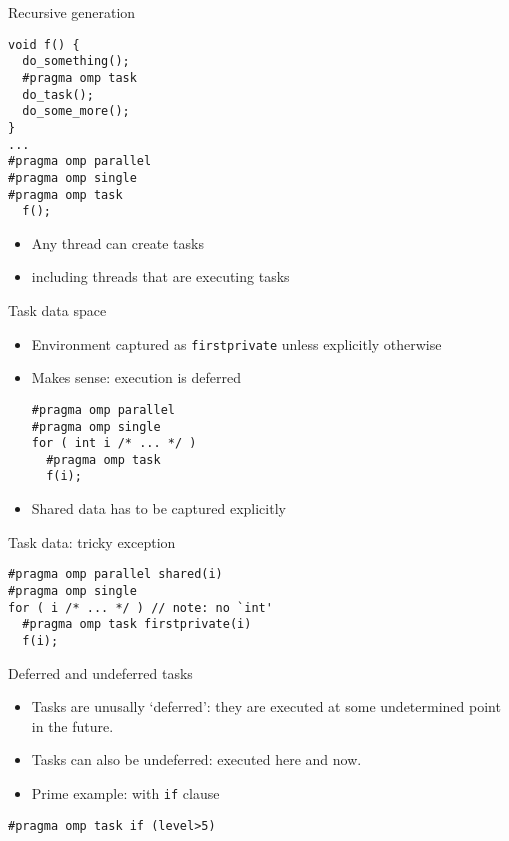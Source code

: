 \begin{numberedframe}{Recursive generation}
\begin{lstlisting}
void f() {
  do_something();
  #pragma omp task
  do_task();
  do_some_more();
}
...
#pragma omp parallel
#pragma omp single
#pragma omp task
  f();
\end{lstlisting}
  \begin{itemize}
  \item Any thread can create tasks
  \item including threads that are executing tasks
  \end{itemize}
\end{numberedframe}

\begin{exerciseframe}[taskfactor]
  
\end{exerciseframe}

\begin{numberedframe}{Task data space}
  \begin{itemize}
  \item Environment captured as \lstinline{firstprivate}
    unless explicitly otherwise
  \item Makes sense: execution is deferred
\begin{lstlisting}
#pragma omp parallel
#pragma omp single
for ( int i /* ... */ )
  #pragma omp task
  f(i);
\end{lstlisting}
  \item Shared data has to be captured explicitly
  \end{itemize}
\end{numberedframe}

\begin{numberedframe}{Task data: tricky exception}
\begin{lstlisting}
#pragma omp parallel shared(i)
#pragma omp single
for ( i /* ... */ ) // note: no `int'
  #pragma omp task firstprivate(i)
  f(i);
\end{lstlisting}
\end{numberedframe}

\begin{numberedframe}{Deferred and undeferred tasks}
  \begin{itemize}
  \item Tasks are unusally `deferred': they are executed
    at some undetermined point in the future.
  \item Tasks can also be undeferred: executed here and now.
  \item Prime example: with \lstinline{if} clause
  \end{itemize}
\begin{lstlisting}
#pragma omp task if (level>5)
\end{lstlisting}
\end{numberedframe}

